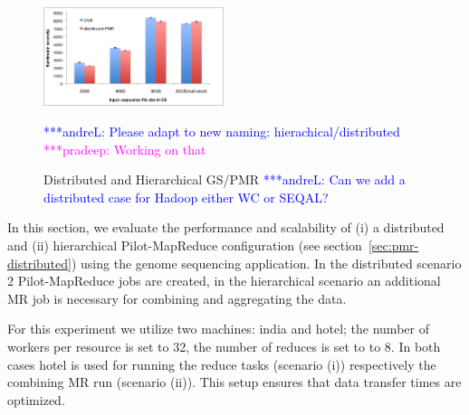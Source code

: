 \documentclass{acm_proc_article-sp}
\newcommand{\alnote}[1]{ {\textcolor{blue} { ***andreL: #1 }}}
\newcommand{\pnote}[1]{ {\textcolor{magenta} { ***pradeep: #1 }}}
\newcommand{\alnote}[1]{}
\newcommand{\pnote}[1]{}
\newcommand{\pilotmapreduce}{Pilot-MapReduce\xspace}
\begin{document}

\begin{figure}[t]
	\centering
		\includegraphics[width=0.47\textwidth]{figures/dmrvspmr.png}
	\caption{Distributed and Hierarchical GS/PMR
	\alnote{Can we add a distributed case for Hadoop either WC or SEQAL?}} 
	\alnote{Please adapt to new naming: hierachical/distributed}
        \pnote{ Working on that}
	\label{fig:figures_dmrvspmr}
\end{figure}


In this section, we evaluate the performance and scalability of (i) a 
distributed and (ii) hierarchical \pilotmapreduce configuration (see
section~\ref{sec:pmr-distributed}) using the genome sequencing application.
In the distributed scenario 2 \pilotmapreduce jobs are created, in the  
hierarchical scenario an additional MR job is necessary for combining and 
aggregating the data.

For this experiment we utilize two machines: india and hotel; the number of
workers per resource is set to 32, the number of reduces is set to to 8. In
both cases hotel is used for running the reduce tasks (scenario (i))
respectively the combining MR run (scenario (ii)). This setup ensures that
data transfer times are optimized.



\end{document}
